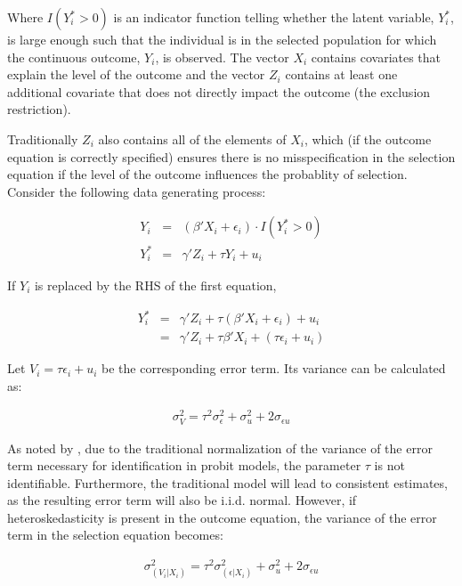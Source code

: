 \documentclass{article}
\begin{document}
Where $I(Y^*_i>0)$ is an indicator function telling whether the latent variable, $Y^*_i$, is large enough such that the individual is in the selected population for which the continuous outcome, $Y_i$, is observed.  The vector $X_i$ contains covariates that explain the level of the outcome and the vector $Z_i$ contains at least one additional covariate that does not directly impact the outcome (the exclusion restriction).  

Traditionally $Z_i$ also contains all of the elements of $X_i$, which (if the outcome equation is correctly specified) ensures there is no misspecification in the selection equation if the level of the outcome influences the probablity of selection. Consider the following data generating process:

\begin{eqnarray*}
Y_i&=&(\beta'X_i + \epsilon_i)\cdot I(Y^*_i>0) \\
Y^*_i&=&\gamma'Z_i +\tau Y_i + u_i
\end{eqnarray*}

 
\noindent If $Y_i$ is replaced by the RHS of the first equation,

\begin{eqnarray*}
Y^*_i&=&\gamma'Z_i +\tau(\beta'X_i + \epsilon_i) + u_i \\
     &=&\gamma'Z_i +\tau\beta'X_i + (\tau\epsilon_i + u_i)
\end{eqnarray*}

\noindent Let $V_i = \tau\epsilon_i + u_i$ be the corresponding error term.  Its variance can be calculated as:

\begin{eqnarray*}
\sigma_{V}^2=\tau^2\sigma_{\epsilon}^2 +\sigma_{u}^2 + 2\sigma_{\epsilon u}
\end{eqnarray*}

As noted by \citet{reichert2014}, due to the traditional normalization of the variance of the error term necessary for identification in probit models, the parameter $\tau$ is not identifiable.  Furthermore, the traditional \citet{heckman1979} model will lead to consistent estimates, as the resulting error term will also be i.i.d. normal.  However, if heteroskedasticity is present in the outcome equation, the variance of the error term in the selection equation becomes:

\begin{eqnarray*}
\sigma_{(V_i|X_i)}^2=\tau^2\sigma_{(\epsilon|X_i)}^2 +\sigma_{u}^2 + 2\sigma_{\epsilon u}  \\
\end{eqnarray*}
\end{document}
